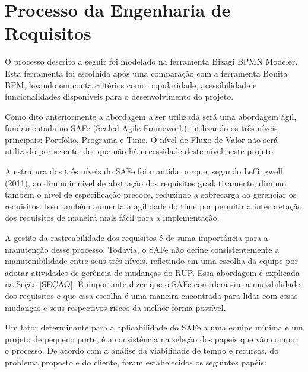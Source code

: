 \chapter[Processo da Engenharia de Requisitos]{Processo da Engenharia de Requisitos}
O processo descrito a seguir foi modelado na ferramenta Bizagi BPMN Modeler. Esta ferramenta foi escolhida após uma comparação com a ferramenta Bonita BPM, levando em conta critérios como popularidade, acessibilidade e funcionalidades disponíveis para o desenvolvimento do projeto.

Como dito anteriormente a abordagem a ser utilizada será uma abordagem ágil, fundamentada no SAFe (Scaled Agile Framework), utilizando os três níveis principais: Portfolio, Programa e Time. O nível de Fluxo de Valor não será utilizado por se entender que não há necessidade deste nível neste projeto.

A estrutura dos três níveis do SAFe foi mantida porque, segundo Leffingwell (2011), ao diminuir nível de abstração dos requisitos gradativamente, diminui também o nível de especificação precoce, reduzindo a sobrecarga ao gerenciar os requisitos. Isso também aumenta a agilidade do time por permitir a interpretação dos requisitos de maneira mais fácil para a implementação.

A gestão da rastreabilidade dos requisitos é de suma importância para a manutenção desse processo. Todavia, o SAFe não define consistentemente a manutenibilidade entre seus três níveis, refletindo em uma escolha da equipe por adotar atividades de gerência de mudanças do RUP. Essa abordagem é explicada na Seção [SEÇÃO]. É importante dizer que o SAFe considera sim a mutabilidade dos requisitos e que essa escolha é uma maneira encontrada para lidar com essas mudanças e seus respectivos riscos da melhor forma possível.

Um fator determinante para a aplicabilidade do SAFe a uma equipe mínima e um projeto de pequeno porte, é a consistência na seleção dos papeis que vão compor o processo. De acordo com a análise da viabilidade de tempo e recursos, do problema proposto e do cliente, foram estabelecidos os seguintes papéis:

